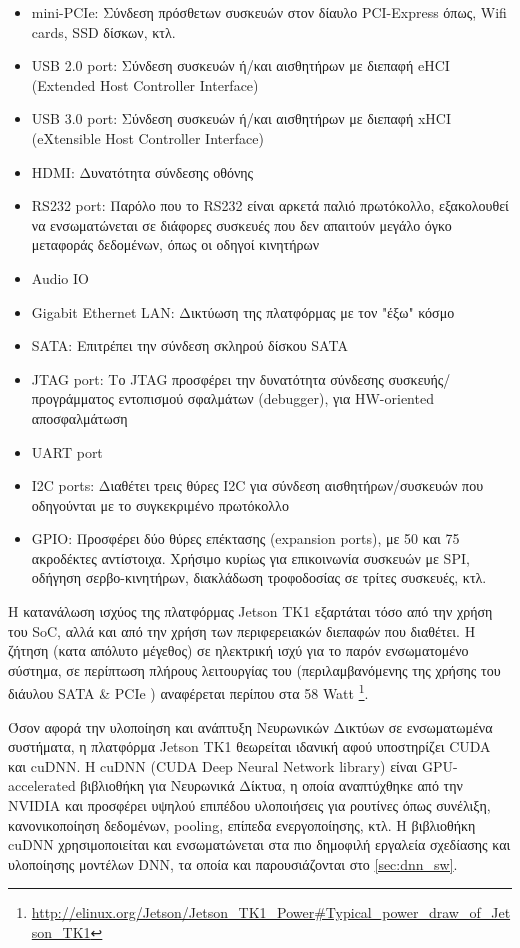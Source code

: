 \begin{itemize}
  \setlength\itemsep{0em}
  \item{mini-PCIe: Σύνδεση πρόσθετων συσκευών στον δίαυλο PCI-Express όπως, Wifi cards, SSD δίσκων, κτλ.}
  \item{USB 2.0 port: Σύνδεση συσκευών ή/και αισθητήρων με διεπαφή eHCI (Extended Host Controller Interface)}
  \item{USB 3.0 port: Σύνδεση συσκευών ή/και αισθητήρων με διεπαφή xHCI (eXtensible Host Controller Interface)}
  \item{HDMI: Δυνατότητα σύνδεσης οθόνης}
  \item{RS232 port: Παρόλο που το RS232 είναι αρκετά παλιό πρωτόκολλο, εξακολουθεί να ενσωματώνεται σε διάφορες συσκευές που δεν απαιτούν μεγάλο όγκο μεταφοράς δεδομένων, όπως οι οδηγοί κινητήρων}
  \item{Audio IO}
  \item{Gigabit Ethernet LAN: Δικτύωση της πλατφόρμας με τον "έξω" κόσμο}
  \item{SATA: Επιτρέπει την σύνδεση σκληρού δίσκου SATA}
  \item{JTAG port: Το JTAG προσφέρει την δυνατότητα σύνδεσης συσκευής/προγράμματος εντοπισμού σφαλμάτων (debugger), για HW-oriented αποσφαλμάτωση}
  \item{UART port}
  \item{I2C ports: Διαθέτει τρεις θύρες I2C για σύνδεση αισθητήρων/συσκευών που οδηγούνται με το συγκεκριμένο πρωτόκολλο}
  \item{GPIO: Προσφέρει δύο θύρες επέκτασης (expansion ports), με 50 και 75 ακροδέκτες αντίστοιχα. Χρήσιμο κυρίως για επικοινωνία συσκευών με SPI, οδήγηση σερβο-κινητήρων, διακλάδωση τροφοδοσίας σε τρίτες συσκευές, κτλ.}
\end{itemize}

Η κατανάλωση ισχύος της πλατφόρμας Jetson TK1 εξαρτάται τόσο από την χρήση
του SoC, αλλά και από την χρήση των περιφερειακών διεπαφών που διαθέτει. Η
ζήτηση (κατα απόλυτο μέγεθος) σε ηλεκτρική ισχύ για το παρόν ενσωματομένο σύστημα,
σε περίπτωση πλήρους λειτουργίας του (περιλαμβανόμενης της χρήσης του διάυλου SATA \& PCIe )
αναφέρεται περίπου στα 58 Watt \footnote{\url{http://elinux.org/Jetson/Jetson_TK1_Power\#Typical_power_draw_of_Jetson_TK1}}.

Όσον αφορά την υλοποίηση και ανάπτυξη Νευρωνικών Δικτύων σε ενσωματωμένα συστήματα,
η πλατφόρμα Jetson TK1 θεωρείται ιδανική αφού υποστηρίζει CUDA και cuDNN.
H cuDNN (CUDA Deep Neural Network library) είναι GPU-accelerated βιβλιοθήκη για Νευρωνικά Δίκτυα,
η οποία αναπτύχθηκε από την NVIDIA και προσφέρει υψηλού επιπέδου υλοποιήσεις για ρουτίνες όπως συνέλιξη,
κανονικοποίηση δεδομένων, pooling, επίπεδα ενεργοποίησης, κτλ.
Η βιβλιοθήκη cuDNN χρησιμοποιείται και ενσωματώνεται στα πιο δημοφιλή εργαλεία σχεδίασης και υλοποίησης μοντέλων DNN,
τα οποία και παρουσιάζονται στο \autoref{sec:dnn_sw}.


